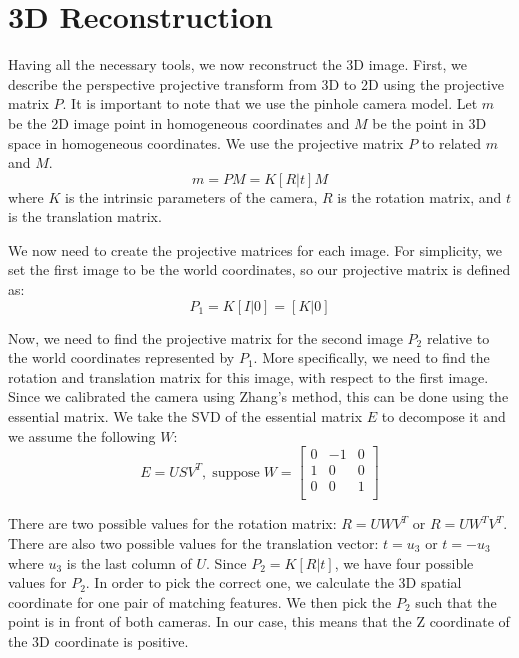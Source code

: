 \section{3D Reconstruction}
\label{s:reconstruction}
Having all the necessary tools, we now reconstruct the 3D image. First, we describe the perspective projective transform from 3D to 2D using the projective matrix $P$. It is important to note that we use the pinhole camera model. Let $m$ be the 2D image point in homogeneous coordinates and $M$ be the point in 3D space in homogeneous coordinates. We use the projective matrix $P$ to related $m$ and $M$.
\begin{equation}
m = PM = K[R | t]M
\end{equation}
where $K$ is the intrinsic parameters of the camera, $R$ is the rotation matrix, and $t$ is the translation matrix.

We now need to create the projective matrices for each image. For simplicity, we set the first image to be the world coordinates, so our projective matrix is defined as:
\begin{equation}
P_1 = K[I | 0] = [K | 0]
\end{equation}

Now, we need to find the projective matrix for the second image $P_2$ relative to the world coordinates represented by $P_1$. More specifically, we need to find the rotation and translation matrix for this image, with respect to the first image. Since we calibrated the camera using Zhang's method, this can be done using the essential matrix. We take the SVD of the essential matrix $E$ to decompose it and we assume the following $W$:
\begin{equation*}
E = USV^T, \; \text{suppose} \; W =
  \left[ {\begin{array}{ccc}
   0 & -1 & 0  \\
  1 & 0 & 0 \\
   0 & 0 & 1 \\
  \end{array} } \right]
\end{equation*}

There are two possible values for the rotation matrix: $R=UWV^T$ or $R=UW^TV^T$. There are also two possible values for the translation vector: $t = u_3$ or $t=-u_3$ where $u_3$ is the last column of $U$. Since $P_2 = K[R |t]$, we have four possible values for $P_2$. In order to pick the correct one, we calculate the 3D spatial coordinate for one pair of matching features. We then pick the $P_2$ such that the point is in front of both cameras. In our case, this means that the Z coordinate of the 3D coordinate is positive. 

